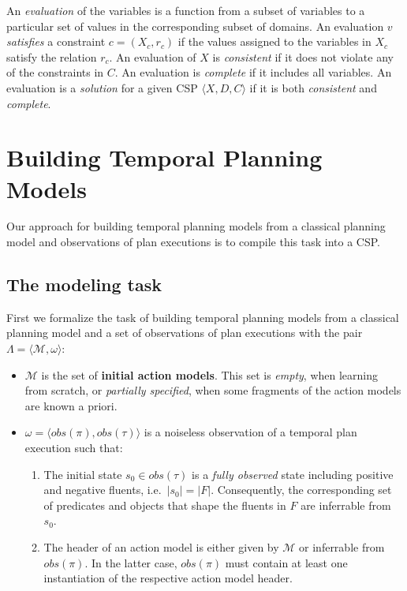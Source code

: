 \documentclass[letterpaper]{article} %
\newcommand{\tup}[1]{{\langle #1 \rangle}}
\begin{document}
An {\em evaluation} of the variables is a function from a subset of variables to a particular set of values in the corresponding subset of domains. An evaluation $v$ {\em satisfies} a constraint $c=(X_c,r_c)$ if the values assigned to the variables in $X_c$ satisfy the relation $r_c$. An evaluation of $X$ is {\em consistent} if it does not violate any of the constraints in $C$. An evaluation is {\em complete} if it includes all variables. An evaluation is a {\em solution} for a given CSP $\tup{X,D,C}$ if it is both {\em consistent} and {\em complete}. 

\section{Building Temporal Planning Models}
\label{sec:learning}
Our approach for building temporal planning models from a classical planning model and observations of plan executions is to compile this task into a CSP. 

\subsection{The modeling task}
First we formalize the task of building temporal planning models from a classical planning model and a set of observations of plan executions with the pair $\Lambda=\tup{\mathcal{M},\omega}$:
\begin{itemize}
\item $\mathcal{M}$ is the set of {\bf initial action models}. This set is {\em empty}, when learning from scratch, or {\em partially specified}, when some fragments of the action models are known a priori.
\item $\omega=\tup{obs(\pi),obs(\tau)}$ is a noiseless observation of a temporal plan execution such that:
\begin{enumerate}
\item The initial state $s_0\in obs(\tau)$ is a {\em fully observed} state including positive and negative fluents, i.e.~$|s_0|=|F|$. Consequently, the corresponding set of predicates and objects that shape the fluents in $F$ are inferrable from $s_0$.
\item The header of an action model is either given by $\mathcal{M}$ or inferrable from $obs(\pi)$. In the latter case, $obs(\pi)$ must contain at least one instantiation of the respective action model header.
\end{enumerate}
\end{itemize}
\end{document}
